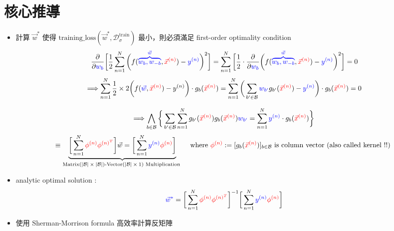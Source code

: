 \documentclass{article}
\begin{document}
\begin{CJK}{UTF8}{bsmi}
\begin{itemize}
\end{itemize}

\newpage 
\section{核心推導}
\begin{itemize}
\item 計算 $\vec{w}^{*}$ 使得  $\text{training\_loss$(\vec{w}^{*},\mathcal{D}^{\text{train}}_{\sigma})$}$ 最小，則必須滿足 first-order optimality condition 
$$  \frac{\partial}{\partial \color{blue}w_b} \bigg[ \frac{1}{2}  \sum_{n=1}^{N}   \bigg(f({\color{blue}\overbrace{w_b,w_{-b}}^{\vec{w}}},{\color{red}\vec{x}^{(n)}}) - {\color{blue}y^{(n)} }\bigg)^2 \bigg] =\sum_{n=1}^{N}\bigg[ \frac{1}{2} \cdot \frac{\partial}{\partial \color{blue}w_b}  \bigg(f({\color{blue}\overbrace{w_b,w_{-b}}^{\vec{w}}},{\color{red}\vec{x}^{(n)}}) - {\color{blue}y^{(n)} }\bigg)^2 \bigg] = 0 $$ $$\Longrightarrow \sum_{n=1}^{N} \frac{1}{2} \times 2\bigg( f({\color{blue}\vec{w}},{\color{red}\vec{x}^{(n)}}) - y^{(n)} \bigg)\cdot g_b({\color{red}\vec{x}^{(n)}}) = \sum_{n=1}^{N} \bigg( \sum_{b' \in \mathcal{B}} {\color{blue}w_{b'}} g_{b'}({\color{red}\vec{x}^{(n)}}) - {\color{blue} y^{(n)}} \bigg) \cdot g_{b}({\color{red}\vec{x}^{(n)}})   = 0 $$

$$ \Longrightarrow  \bigwedge_{b \in \mathcal{B}} \bigg\{ \sum_{b' \in \mathcal{B}}   \sum_{n=1}^{N}g_{b'}({\color{red}\vec{x}^{(n)}})g_{b}({\color{red}\vec{x}^{(n)}}) {\color{blue}w_{b'}} = \sum_{n=1}^{N}  {\color{blue}y^{(n)}} \cdot  g_{b}({\color{red}\vec{x}^{(n)}}) \bigg\} $$ $$ \equiv \underbrace{  \bigg[\sum_{n=1}^{N} {\color{red}\phi^{(n)}\phi^{(n)^T}} \bigg] \vec{w} = \bigg[\sum_{n=1}^{N} {\color{blue}y^{(n)}} {\color{red}\phi^{(n)}} \bigg]}_{\text{Matrix$(|\mathcal{B}| \times |\mathcal{B}|)$-Vector$(|\mathcal{B}| \times 1)$ Multiplication }} \quad \text{where } {\color{red}\phi^{(n)}} := [g_{b}({\color{red}\vec{x}^{(n)}})]_{b \in \mathcal{B}} \text{ is column vector (also called kernel !!) }   $$

\item analytic optimal solution :
$$ {\color{blue} \vec{w}^{*}} =   \bigg[\sum_{n=1}^{N} {\color{red}\phi^{(n)}\phi^{(n)^T}} \bigg]^{-1}\bigg[\sum_{n=1}^{N} {\color{blue}y^{(n)}} {\color{red}\phi^{(n)}} \bigg]   $$


\item 使用 Sherman-Morrison formula 高效率計算反矩陣


\end{itemize}

\end{CJK}
\end{document}
